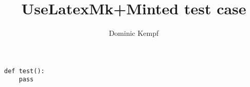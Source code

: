 \documentclass[a4paper,10pt]{article}
\title{UseLatexMk+Minted test case}
\author{Dominic Kempf}
\begin{document}
\maketitle

\begin{verbatim}
def test():
    pass
\end{verbatim}
\blindtext{}
\end{document}
